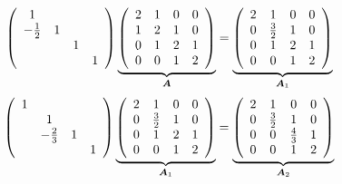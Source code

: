\begin{frame}\ft{\secname}
\begin{small}
\begin{jie}
  $$
   \left(
  \begin{array}{cccc}
  1 & && \\
  -\frac12 &1&&\\
  &&1&\\
  &&&1
  \end{array}
  \right)\underbrace{\left(
  \begin{array}{cccc}
  2 & 1 & 0 & 0\\
  1 & 2 & 1 & 0\\
  0 & 1 & 2 & 1\\
  0 & 0 & 1 & 2
  \end{array}
  \right)}_{\boldsymbol{A}}=  \underbrace{\left(
  \begin{array}{cccc}
  2 & 1 & 0 & 0\\
  0 & \frac32 & 1 & 0\\
  0 & 1 & 2 & 1\\
  0 & 0 & 1 & 2
  \end{array}
  \right)}_{\boldsymbol{A}_1}
  $$
\pause
  $$
  \left(
    \begin{array}{cccc}
      1 & && \\
        &1&&\\
        &-\frac23&1&\\
        &&&1
    \end{array}
  \right)\underbrace{\left(
        \begin{array}{cccc}
        2 & 1 & 0 & 0\\
        0 & \frac32 & 1 & 0\\
        0 & 1 & 2 & 1\\
        0 & 0 & 1 & 2
        \end{array}
        \right)}_{\boldsymbol{A}_1} = \underbrace{\left(
    \begin{array}{cccc}
      2 & 1 & 0 & 0\\
      0 & \frac32 & 1 & 0\\
      0 & 0 & \frac43 & 1\\
      0 & 0 & 1 & 2
    \end{array}
  \right)}_{\boldsymbol{A}_2}
  $$
\pause


\end{jie}
\end{small}
\end{frame}
